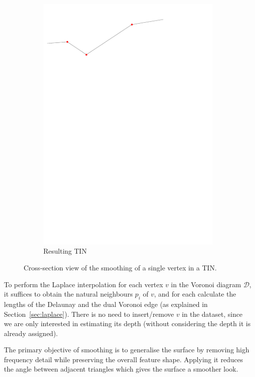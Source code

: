 \begin{figure}[tbh]
\begin{subfigure}[b]{0.45\linewidth}
    \includegraphics[width=\textwidth,page=4]{figs/1Dsmoothop.pdf}
    \caption{Resulting TIN}\label{fig:1Dsmoothop:d}
  \end{subfigure}
  \caption{Cross-section view of the smoothing of a single vertex in a TIN.}
\label{fig:1Dsmoothop}
\end{figure}

To perform the Laplace interpolation for each vertex $v$ in the Voronoi diagram $\mathcal{D}$, it suffices to obtain the natural neighbours $p_i$ of $v$, and for each calculate the lengths of the Delaunay and the dual Voronoi edge (as explained in Section~\ref{sec:laplace}).
There is no need to insert/remove $v$ in the dataset, since we are only interested in estimating its depth (without considering the depth it is already assigned).

The primary objective of smoothing is to generalise the surface by removing high frequency detail while preserving the overall feature shape. 
Applying it reduces the angle between adjacent triangles which gives the surface a smoother look.

